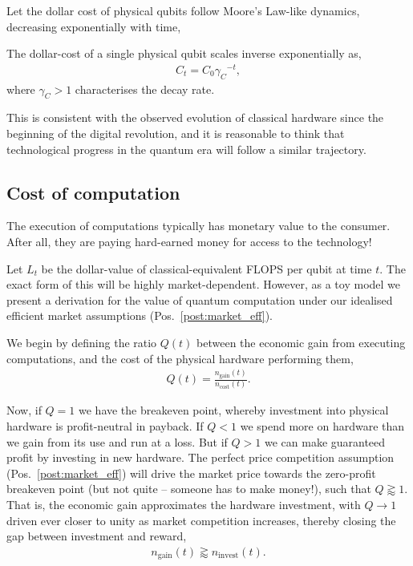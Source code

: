 Let the dollar cost of physical qubits follow Moore's Law-like dynamics, decreasing exponentially with time,
\begin{postulate}\label{post:hardware_cost}
The dollar-cost of a single physical qubit scales inverse exponentially as,
\begin{align}
	C_t = C_0 {\gamma_C}^{-t},
\end{align}
where \mbox{$\gamma_C>1$} characterises the decay rate.
\end{postulate}

This is consistent with the observed evolution of classical hardware since the beginning of the digital revolution, and it is reasonable to think that technological progress in the quantum era will follow a similar trajectory.

%
%

\subsection{Cost of computation}\label{sec:cost_of_comp} 

The execution of computations typically has monetary value to the consumer. After all, they are paying hard-earned money for access to the technology!

Let $L_t$ be the dollar-value of classical-equivalent FLOPS per qubit at time $t$. The exact form of this will be highly market-dependent. However, as a toy model we present a derivation for the value of quantum computation under our idealised efficient market assumptions (Pos.~\ref{post:market_eff}).

We begin by defining the ratio $Q(t)$ between the economic gain from executing computations, and the cost of the physical hardware performing them,
\begin{align}
Q(t)=\frac{n_\text{gain}(t)}{n_\text{cost}(t)}.
\end{align}

Now, if \mbox{$Q=1$} we have the breakeven point, whereby investment into physical hardware is profit-neutral in payback. If \mbox{$Q<1$} we spend more on hardware than we gain from its use and run at a loss. But if \mbox{$Q>1$} we can make guaranteed profit by investing in new hardware. The perfect price competition assumption (Pos.~\ref{post:market_eff}) will drive the market price towards the zero-profit breakeven point (but not quite -- someone has to make money!), such that \mbox{$Q\gtrapprox 1$}. That is, the economic gain approximates the hardware investment, with $Q\to 1$ driven ever closer to unity as market competition increases, thereby closing the gap between investment and reward,
\begin{align} \label{sec:gain_eq_invest}
	n_\text{gain}(t) \gtrapprox n_\text{invest}(t).
\end{align}

